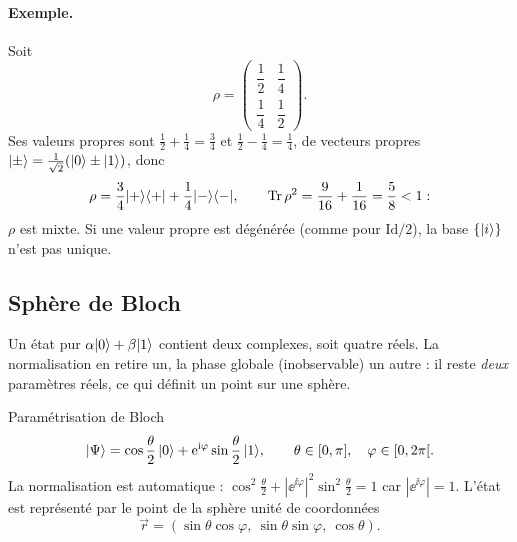 \paragraph{Exemple.} Soit
\[
  \rho=\begin{pmatrix}\dfrac12 & \dfrac14\\[0.6ex] \dfrac14 & \dfrac12\end{pmatrix}.
\]
Ses valeurs propres sont $\frac12+\frac14=\frac34$ et $\frac12-\frac14=\frac14$, de
vecteurs propres $|\pm\rangle=\frac{1}{\sqrt2}(|0\rangle\pm|1\rangle)$, donc
\[
  \rho=\frac34|+\rangle\langle +|+\frac14|-\rangle\langle -|,
  \qquad \operatorname{Tr}\rho^2=\frac9{16}+\frac1{16}=\frac58<1 :
\]
$\rho$ est mixte.
Si une valeur propre est dégénérée (comme pour $\mathrm{Id}/2$), la base $\{|i\rangle\}$
n'est pas unique.

\subsection{Sphère de Bloch}\label{sec:bloch}

Un état pur $\alpha|0\rangle+\beta|1\rangle$ contient deux complexes, soit quatre réels. La
normalisation en retire un, la phase globale (inobservable) un autre : il reste
\emph{deux} paramètres réels, ce qui définit un point sur une sphère.

\begin{definition}{Paramétrisation de Bloch}
\[
  |\Psi\rangle=\cos\frac{\theta}{2}\,|0\rangle+\mathrm{e}^{\mathrm{i}\varphi}\sin\frac{\theta}{2}\,|1\rangle,
  \qquad \theta\in[0,\pi],\quad\varphi\in[0,2\pi[ .
\]
La normalisation est automatique : $\cos^2\frac\theta2+|\ee^{\ii\varphi}|^2\sin^2\frac\theta2=1$
car $|\ee^{\ii\varphi}|=1$. L'état est représenté par le point de la sphère unité de
coordonnées
\[
  \vec r=(\sin\theta\cos\varphi,\ \sin\theta\sin\varphi,\ \cos\theta).
\]
\end{definition}

